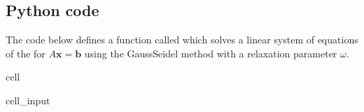 \documentclass[letterpaper,10pt,english]{jupyterBook}
\begin{document}
\subsection{Python code}
\label{\detokenize{7_Indirect_methods/7.4_SOR_method:python-code}}
\sphinxAtStartPar
The code below defines a function called  which solves a linear system of equations of the for \(A \mathbf{x} = \mathbf{b}\) using the Gauss\sphinxhyphen{}Seidel method with a relaxation parameter \(\omega\).

\begin{sphinxuseclass}{cell}\begin{sphinxVerbatimInput}

\begin{sphinxuseclass}{cell_input}
\begin{sphinxVerbatim}[commandchars=\\\{\}]
    
      
      
      
       
           
              \PYG{p}{[}\PYG{p}{]}
               
                   
                      \PYG{p}{[}\PYG{p}{]}  \PYG{p}{[}\PYG{p}{]}
        
            \PYG{p}{[}\PYG{p}{]}      \PYG{p}{[}\PYG{p}{]}    \PYG{p}{[}\PYG{p}{]}  
            
                
           
    
     
\end{sphinxVerbatim}

\end{sphinxuseclass}\end{sphinxVerbatimInput}

\end{sphinxuseclass}
\sphinxstepscope
\end{document}
